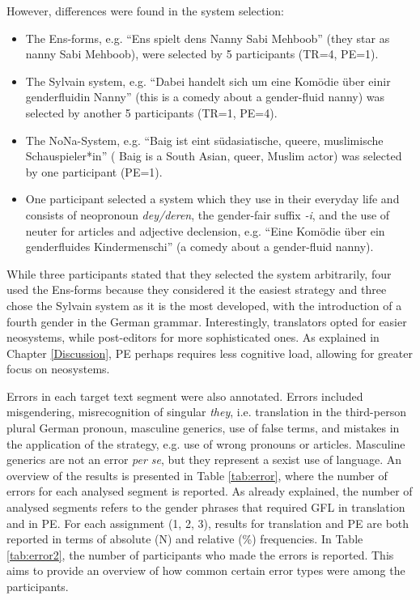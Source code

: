 However, differences were found in the system selection:
\begin{itemize}
\setlength\itemsep{-0.5em}
    \item The Ens-forms, e.g. ``Ens spielt dens Nanny Sabi Mehboob'' (they star as nanny Sabi Mehboob), were selected by 5 participants (TR=4, PE=1).
    \item The Sylvain system, e.g. ``Dabei handelt sich um eine Komödie über einir genderfluidin Nanny'' (this is a comedy about a gender-fluid nanny) was selected by another 5 participants (TR=1, PE=4).
    \item The NoNa-System, e.g. ``Baig ist eint südasiatische, queere, muslimische Schauspieler*in'' ( Baig is a South Asian, queer, Muslim actor) was selected by one participant (PE=1).
    \item One participant selected a system which they use in their everyday life and consists of neopronoun \textit{dey/deren}, the gender-fair suffix \textit{-i}, and the use of neuter for articles and adjective declension, e.g. ``Eine Komödie über ein genderfluides Kindermenschi'' (a comedy about a gender-fluid nanny).
\end{itemize}
While three participants stated that they selected the system arbitrarily, four used the Ens-forms because they considered it the easiest strategy and three chose the Sylvain system as it is the most developed, with the introduction of a fourth gender in the German grammar. Interestingly, translators opted for easier neosystems, while post-editors for more sophisticated ones. As explained in Chapter \ref{Discussion}, PE perhaps requires less cognitive load, allowing for greater focus on neosystems.


Errors in each target text segment were also annotated. Errors included misgendering, misrecognition of singular \textit{they}, i.e. translation in the third-person plural German pronoun, masculine generics, use of false terms, and mistakes in the application of the strategy, e.g. use of wrong pronouns or articles. Masculine generics are not an error \textit{per se}, but they represent a sexist use of language. An overview of the results is presented in Table \ref{tab:error}, where the number of errors for each analysed segment is reported. As already explained, the number of analysed segments refers to the gender phrases that required GFL in translation and in PE. For each assignment (1, 2, 3), results for translation and PE are both reported in terms of absolute (N) and relative (\%) frequencies. In Table \ref{tab:error2}, the number of participants who made the errors is reported. This aims to provide an overview of how common certain error types were among the participants.

